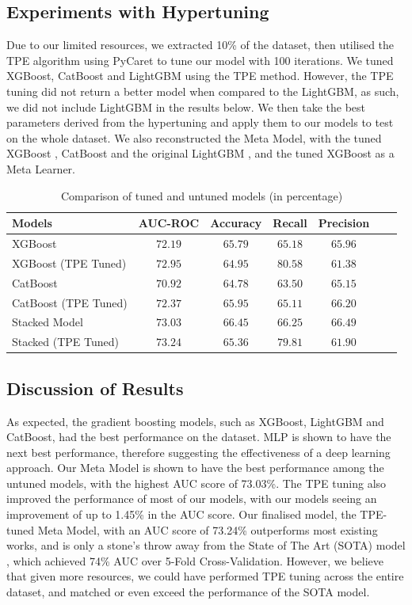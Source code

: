 \documentclass[runningheads]{llncs}
\begin{document}
\subsection{Experiments with Hypertuning}
Due to our limited resources, we extracted 10\% of the dataset, then utilised the TPE algorithm using PyCaret \cite{pycaret} to tune our model with 100 iterations. We tuned XGBoost, CatBoost and LightGBM using the TPE method. However, the TPE tuning did not return a better model when compared to the LightGBM, as such, we did not include LightGBM in the results below. We then take the best parameters derived from the hypertuning and apply them to our models to test on the whole dataset. We also reconstructed the Meta Model, with the tuned XGBoost \cite{Chen:2016:XST:2939672.2939785}, CatBoost \cite{cat} and the original LightGBM \cite{ke2017lightgbm}, and the tuned XGBoost as a Meta Learner. 
\begin{table}
\centering
\caption{Comparison of tuned and untuned models (in percentage)}
\label{tab:allaimodels}
\begin{tabular}{@{}lcccccc@{}}
\toprule %
 {\bf Models} & {\bf AUC-ROC} & {\bf Accuracy} & {\bf Recall} & {\bf Precision} \\ \midrule %
XGBoost & $72.19$ & $65.79$ & $65.18$ & $65.96$ \\ %
 XGBoost (TPE Tuned) & $72.95$ & $64.95$ & $\mathbf{80.58}$ & $61.38$ \\ \hline
CatBoost & $70.92$ & $64.78$ & $63.50$ & $65.15$ \\ %
 CatBoost (TPE Tuned) & $72.37$ & $65.95$ & $65.11$ & $66.20$ \\ \hline
Stacked Model & $73.03$ & $\mathbf{66.45}$ & $66.25$ & $\mathbf{66.49}$ \\ %
 Stacked (TPE Tuned) & $\mathbf{73.24}$ & $65.36$ & $79.81$ & $61.90$ \\ \bottomrule %
\end{tabular}%
\vspace{-2ex}
\end{table}

\subsection{Discussion of Results}
As expected, the gradient boosting models, such as XGBoost, LightGBM and CatBoost, had the best performance on the dataset. MLP is shown to have the next best performance, therefore suggesting the effectiveness of a deep learning approach. Our Meta Model is shown to have the best performance among the untuned models, with the highest AUC score of 73.03\%. The TPE tuning also improved the performance of most of our models, with our models seeing an improvement of up to 1.45\% in the AUC score. Our finalised model, the TPE-tuned Meta Model, with an AUC score of 73.24\% outperforms most existing works, and is only a stone's throw away from the State of The Art (SOTA) model \cite{shahini2019}, which achieved 74\% AUC over 5-Fold Cross-Validation. However, we believe that given more resources, we could have performed TPE tuning across the entire dataset, and matched or even exceed the performance of the SOTA model. 
\end{document}
